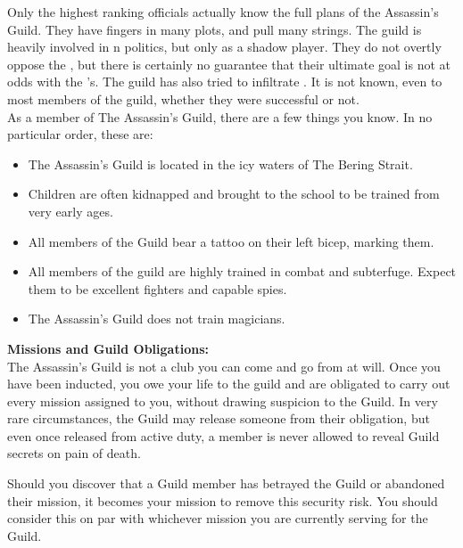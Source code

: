 \documentclass[blue]{NeptuneBall}
\begin{document}
\name{\bAssassin{}}

Only the highest ranking officials actually know the full plans of the Assassin's Guild. They have fingers in many plots, and pull many strings. The guild is heavily involved in \pPacifica{}n politics, but only as a shadow player.  They do not overtly oppose the \cPacificanRuler{\King}, but there is certainly no guarantee that their ultimate goal is not at odds with the \cPacificanRuler{\King}'s. The guild has also tried to infiltrate \pAtlantis{}. It is not known, even to most members of the guild, whether they were successful or not.\\

As a member of The Assassin's Guild, there are a few things you know. In no particular order, these are:

\begin{itemize}
  \item The Assassin's Guild is located in the icy waters of The Bering Strait.
  \item Children are often kidnapped and brought to the school to be trained from very early ages.
  \item All members of the Guild bear a tattoo on their left bicep, marking them.
  \item All members of the guild are highly trained in combat and subterfuge. Expect them to be excellent fighters and capable spies.
  \item The Assassin's Guild does not train magicians.\\
\end{itemize}

{\bf Missions and Guild Obligations:}\\
The Assassin's Guild is not a club you can come and go from at will. Once you have been inducted, you owe your life to the guild and are obligated to carry out every mission assigned to you, without drawing suspicion to the Guild. In very rare circumstances, the Guild may release someone from their obligation, but even once released from active duty, a member is never allowed to reveal Guild secrets on pain of death.

Should you discover that a Guild member has betrayed the Guild or abandoned their mission, it becomes your mission to remove this security risk. You should consider this on par with whichever mission you are currently serving for the Guild.
\end{document}
